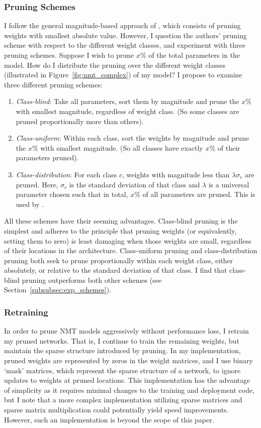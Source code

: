 \subsubsection{Pruning Schemes}
\label{subsubsec:approach_schemes}
I follow the general magnitude-based approach of \cite{han2015learning}, which consists of pruning weights with smallest absolute value. However, I question the authors' pruning scheme with respect to the different weight classes, and experiment with three pruning schemes.
Suppose I wish to prune $x$\% of the total parameters in the model. 
How do I distribute the pruning over the different weight classes (illustrated in Figure~\ref{fig:nmt_complex}) of my model? 
I propose to examine three different pruning schemes:
\begin{enumerate}
\item \textit{Class-blind}: 
Take all parameters, sort them by magnitude and prune the $x$\% with smallest magnitude, regardless of weight class.
(So some classes are pruned proportionally more than others).
\item \textit{Class-uniform}: 
Within each class, sort the weights by magnitude and prune the $x$\% with smallest magnitude.
(So all classes have exactly $x$\% of their parameters pruned).
\item \textit{Class-distribution}: 
 For each class $c$, weights with magnitude less than $\lambda \sigma_c$ are
 pruned. Here, $\sigma_c$ is the standard deviation of that class and $\lambda$ is a universal parameter chosen such that in total, $x\%$ of all parameters are pruned.
This is used by \cite{han2015learning}.
\end{enumerate}
All these schemes have their seeming advantages.
Class-blind pruning is the simplest and adheres to the principle that pruning
weights (or equivalently, setting them to zero) is least damaging when
those weights are small, regardless of their locations in the architecture.
Class-uniform pruning and class-distribution pruning both seek to prune
proportionally within each weight class, either absolutely, or relative to the
standard deviation of that class.
I find that class-blind pruning outperforms both other schemes (see
Section~\ref{subsubsec:exp_schemes}).

\subsubsection{Retraining}
\label{subsubsec:approach_retraining}
In order to prune NMT models aggressively without performance loss, I retrain my pruned networks. 
That is, I continue to train the remaining weights, but maintain the sparse structure introduced by pruning.
In my implementation, pruned weights are represented by zeros in the weight matrices, 
and I use binary `mask' matrices, which represent the sparse structure of a network, 
to ignore updates to weights at pruned locations.
This implementation has the advantage of simplicity as it requires minimal changes to the training and deployment code, 
but I note that a more complex implementation utilizing sparse matrices and sparse matrix multiplication could potentially yield speed improvements.
However, such an implementation is beyond the scope of this paper.

